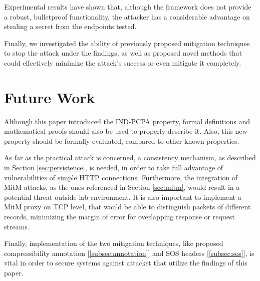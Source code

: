 Experimental results have shown that, although the framework does not provide a
robust, bulletproof functionality, the attacker has a considerable advantage on
stealing a secret from the endpoints tested.

Finally, we investigated the ability of previously proposed mitigation
techniques to stop the attack under the findings, as well as proposed novel
methods that could effectively minimize the attack's success or even mitigate it
completely.

\section{Future Work}

Although this paper introduced the IND-PCPA property, formal definitions and
mathematical proofs should also be used to properly describe it. Also, this new
property should be formally evaluated, compared to other known properties.

As far as the practical attack is concerned, a consistency mechanism, as
described in Section \ref{sec:persistence}, is needed, in order to take full
advantage of vulnerabilities of simple HTTP connections. Furthermore, the
integration of MitM attacks, as the ones referenced in Section \ref{sec:mitm},
would result in a potential threat outside lab environment. It is also important
to implement a MitM proxy on TCP level, that would be able to distinguish
packets of different records, minimizing the margin of error for overlapping
response or request streams.

Finally, implementation of the two mitigation techniques, like proposed
compressibility annotation [\ref{subsec:annotation}] and SOS headers
[\ref{subsec:sos}], is vital in order to secure systems against attackst that
utilize the findings of this paper.
